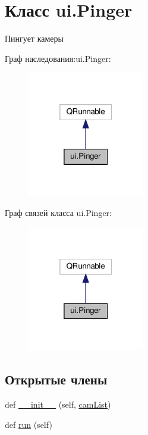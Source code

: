 \hypertarget{classui_1_1_pinger}{}\section{Класс ui.\+Pinger}
\label{classui_1_1_pinger}


Пингует камеры  




Граф наследования\+:ui.\+Pinger\+:\nopagebreak
\begin{figure}[H]
\begin{center}
\leavevmode
\includegraphics[width=145pt]{classui_1_1_pinger__inherit__graph}
\end{center}
\end{figure}


Граф связей класса ui.\+Pinger\+:\nopagebreak
\begin{figure}[H]
\begin{center}
\leavevmode
\includegraphics[width=145pt]{classui_1_1_pinger__coll__graph}
\end{center}
\end{figure}
\subsection*{Открытые члены}
\begin{DoxyCompactItemize}
\item 
def \hyperlink{classui_1_1_pinger_a6e76192168383c7fbb72d6add7f27e80}{\+\_\+\+\_\+init\+\_\+\+\_\+} (self, \hyperlink{classui_1_1_pinger_ac752aa12f824b1fd0ce9b94f7b3b14fe}{cam\+List})
\item 
def \hyperlink{classui_1_1_pinger_ab94b3da4c7611e8075fa7fe7adb0c901}{run} (self)
\end{DoxyCompactItemize}
